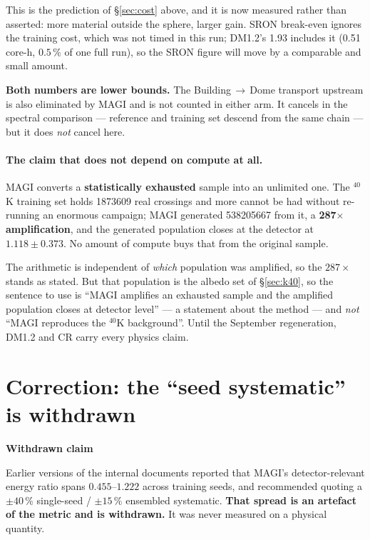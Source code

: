 \documentclass[11pt,a4paper]{article}
\newenvironment{callout}[3]%
{\par\medskip\noindent
 \def\calloutframe{#1}\def\calloutback{#2}%
 \setlength{\fboxrule}{0.9pt}\setlength{\fboxsep}{8pt}%
 \begin{lrbox}{\calloutbox}%
 \begin{minipage}{\dimexpr\textwidth-2\fboxsep-2\fboxrule\relax}%
 \setlength{\parskip}{4pt}%
 \textcolor{#1}{\textbf{#3}}\par\nobreak\smallskip}
{\end{minipage}\end{lrbox}%
 \fcolorbox{\calloutframe}{\calloutback}{\usebox{\calloutbox}}%
 \par\medskip}
\begin{document}
This is the prediction of \S\ref{sec:cost} above, and it is now measured rather
than asserted: more material outside the sphere, larger gain. SRON break-even
ignores the training cost, which was not timed in this run; DM1.2's 1.93
includes it (0.51 core-h, $0.5\,\%$ of one full run), so the SRON figure will
move by a comparable and small amount.

\textbf{Both numbers are lower bounds.} The Building\,$\to$\,Dome transport
upstream is also eliminated by MAGI and is not counted in either arm. It
cancels in the spectral comparison --- reference and training set descend from
the same chain --- but it does \emph{not} cancel here.

\paragraph{The claim that does not depend on compute at all.}
MAGI converts a \textbf{statistically exhausted} sample into an unlimited one.
The $^{40}$K training set holds \num{1873609} real crossings and more cannot be
had without re-running an enormous campaign; MAGI generated \num{538205667} from
it, a \textbf{287$\times$ amplification}, and the generated population closes at
the detector at $1.118 \pm 0.373$. No amount of compute buys that from the
original sample.

The arithmetic is independent of \emph{which} population was amplified, so the
$287\times$ stands as stated. But that population is the albedo set of
\S\ref{sec:k40}, so the sentence to use is ``MAGI amplifies an exhausted sample
and the amplified population closes at detector level'' --- a statement about
the method --- and \emph{not} ``MAGI reproduces the $^{40}$K background''.
Until the September regeneration, DM1.2 and CR carry every physics claim.

\section{Correction: the ``seed systematic'' is withdrawn}
\label{sec:seed}

\begin{callout}{warn}{red!4}{Withdrawn claim}
Earlier versions of the internal documents reported that MAGI's
detector-relevant energy ratio spans $0.455$--$1.222$ across training seeds, and
recommended quoting a $\pm40\,\%$ single-seed / $\pm15\,\%$ ensembled
systematic. \textbf{That spread is an artefact of the metric and is
withdrawn.} It was never measured on a physical quantity.
\end{callout}
\end{document}
